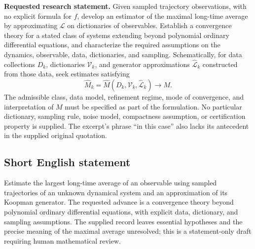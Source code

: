 \documentclass[11pt]{article}
\begin{document}
\textbf{Requested research statement.} Given sampled trajectory observations, with no explicit formula for \(f\), develop an estimator of the maximal long-time average by approximating \(\mathcal L\) on dictionaries of observables. Establish a convergence theory for a stated class of systems extending beyond polynomial ordinary differential equations, and characterize the required assumptions on the dynamics, observable, data, dictionaries, and sampling. Schematically, for data collections \(D_k\), dictionaries \(\mathcal V_k\), and generator approximations \(\widehat{\mathcal L}_k\) constructed from those data, seek estimates satisfying
\[
\widehat M_k=\widehat M(D_k,\mathcal V_k,\widehat{\mathcal L}_k)\longrightarrow M.
\]
The admissible class, data model, refinement regime, mode of convergence, and interpretation of \(M\) must be specified as part of the formulation. No particular dictionary, sampling rule, noise model, compactness assumption, or certification property is supplied. The excerpt's phrase ``in this case'' also lacks its antecedent in the supplied original quotation.
\subsection{Short English statement}
Estimate the largest long-time average of an observable using sampled trajectories of an unknown dynamical system and an approximation of its Koopman generator. The requested advance is a convergence theory beyond polynomial ordinary differential equations, with explicit data, dictionary, and sampling assumptions. The supplied record leaves essential hypotheses and the precise meaning of the maximal average unresolved; this is a statement-only draft requiring human mathematical review.
\end{document}
